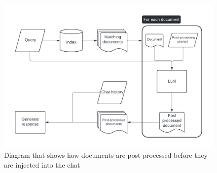 
\begin{figure}[H]
    \centering
    \includegraphics[width=\textwidth]{content/figures/assets/11-with-processing.pdf}
    \caption{Diagram that shows how documents are post-processed before they are injected into the chat}
    \label{fig:with_post_processing}
\end{figure}
